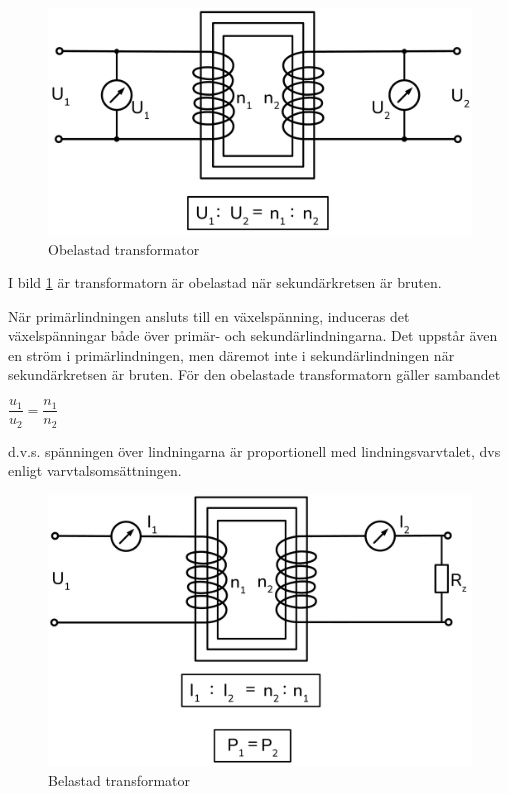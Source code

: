 \begin{figure}[ht]
\begin{center}
\includegraphics[width=\textwidth]{images/cropped_pdfs/bild_2_2-06.pdf}
\caption{Obelastad transformator}
\label{fig:BildII2-6}
\end{center}
\end{figure}

I bild \ref{fig:BildII2-6} är transformatorn är obelastad när sekundärkretsen
är bruten.

När primärlindningen ansluts till en växelspänning, induceras det
växelspänningar både över primär- och sekundärlindningarna. Det uppstår även en
ström i primärlindningen, men däremot inte i sekundärlindningen när
sekundärkretsen är bruten. För den obelastade transformatorn gäller sambandet

\(\dfrac{u_1}{u_2} = \dfrac{n_1}{n_2}\)

d.v.s. spänningen över lindningarna är proportionell med lindningsvarvtalet,
dvs enligt varvtalsomsättningen.

\begin{figure}[ht]
\begin{center}
\includegraphics[width=\textwidth]{images/cropped_pdfs/bild_2_2-07.pdf}
\caption{Belastad transformator}
\label{fig:BildII2-7}
\end{center}
\end{figure}

